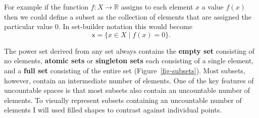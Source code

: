 \documentclass[
  letterpaper,
  DIV=11,
  numbers=noendperiod]{scrartcl}
\begin{document}
For example if the function \(f : X \rightarrow \mathbb{R}\) assigns to
each element \(x\) a value \(f(x)\) then we could define a subset as the
collection of elements that are assigned the particular value \(0\). In
set-builder notation this would become \[
\mathsf{x} = \{ x \in X \mid f(x) = 0 \}.
\]

The power set derived from any set always contains the \textbf{empty
set} consisting of no elements, \textbf{atomic sets} or
\textbf{singleton sets} each consisting of a single element, and a
\textbf{full set} consisting of the entire set
(Figure~\ref{fig-subsets}). Most subsets, however, contain an
intermediate number of elements. One of the key features of uncountable
spaces is that most subsets also contain an uncountable number of
elements. To visually represent subsets containing an uncountable number
of elements I will used filled shapes to contrast against individual
points.
\end{document}
